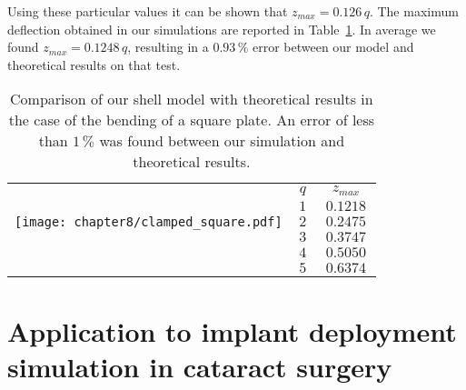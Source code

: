 Using these particular values it can be shown that $z_{max} = 0.126\,q$. The maximum deflection obtained in our simulations are reported in Table~\ref{chap8:tab-results}. In average we found $z_{max} = 0.1248\,q $, resulting in a $0.93\,\%$ error between our model and theoretical results on that test. 
%
\begin{table}[ht]
	\centering
	\begin{tabular}{p{9cm}|c|c|}
	\cline{2-3}
	\multirow{5}{*}{\texttt{[image: chapter8/clamped\_square.pdf]}} & $q$ & $z_{max}$ \tabularnewline
	\cline{2-3}
	& $\,1\,$ & $\, 0.1218 \,$ \tabularnewline
	& $\,2\,$ & $\, 0.2475 \,$ \tabularnewline		
	& $\,3\,$ & $\, 0.3747 \,$ \tabularnewline	
	& $\,4\,$ & $\, 0.5050 \,$ \tabularnewline		
	& $\,5\,$ & $\, 0.6374 \,$ \tabularnewline
	\cline{2-3}
	\end{tabular}
	\vspace{1cm}
	\caption[Test of our shell model with the bending of a square plate]{Comparison of our shell model with theoretical results in the case of the bending of a square plate. An error of less than $1\,\%$ was found between our simulation and theoretical results.}
	\label{chap8:tab-results}
\end{table}


\section{Application to implant deployment simulation in cataract surgery}

